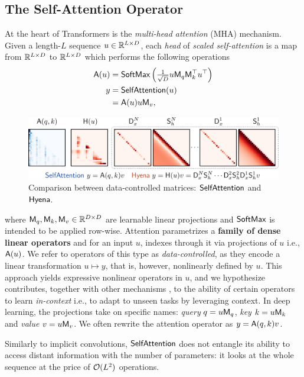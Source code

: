 \subsection{The Self-Attention Operator}
%
At the heart of Transformers is the \textit{multi-head attention} (MHA) mechanism. Given a length-$L$ sequence $u\in\mathbb{R}^{L\times D}$, each \textit{head} of \textit{scaled self-attention} \citep{vaswani2017attention} is a map from $\mathbb{R}^{L\times D}$ to $\mathbb{R}^{L\times D}$ which performs the following operations
%
\begin{equation}\label{eq:att}
    \begin{aligned}
      \mathsf{A}(u) &= {\sf SoftMax}\left(\tfrac{1}{\sqrt{D}}u \mathsf{M}_q \mathsf{M}^\top_k u^\top \right)\\
      y &= {\sf SelfAttention}(u) \\
        &= \mathsf{A}(u)u \mathsf{M}_v,
    \end{aligned}
\end{equation}
%
\begin{figure}[t]
    \centering
    \includegraphics[width=0.69\linewidth]{figures/attention.png}
    \vspace{-2mm}
    \caption{Comparison between data-controlled matrices: $\sf SelfAttention$ and $\sf Hyena$.}
    \label{fig:hyena_matrices}
\end{figure}
%
where $\mathsf{M}_q, \mathsf{M}_k, \mathsf{M}_v\in\mathbb{R}^{D\times D}$ are learnable linear projections and ${\sf SoftMax}$ is intended to be applied row-wise. Attention parametrizes a \textbf{family of dense linear operators} and for an input $u$, indexes through it via projections of $u$ i.e., $\mathsf{A}(u)$. We refer to operators of this type as \textit{data-controlled}, as they encode a linear transformation $u \mapsto y$, that is, however, nonlinearly defined by $u$. This approach yields expressive nonlinear operators in $u$, and we hypothesize contributes, together with other mechanisms \citep{olsson2022context}, to the ability of certain operators to learn \textit{in-context} i.e., to adapt to unseen tasks by leveraging context. In deep learning, the projections take on specific names: \textit{query} $q=u\mathsf{M}_q$, \textit{key} $k=u\mathsf{M}_k$ and \textit{value} $v = u\mathsf{M}_v$. We often rewrite the attention operator as $y = \mathsf{A}(q,k)v$.
%
\begin{remark}
    Similarly to implicit convolutions, $\sf SelfAttention$ does not entangle its ability to access distant information with the number of parameters: it looks at the whole sequence at the price of $\mathcal{O}(L^2)$ operations.
\end{remark}
%

